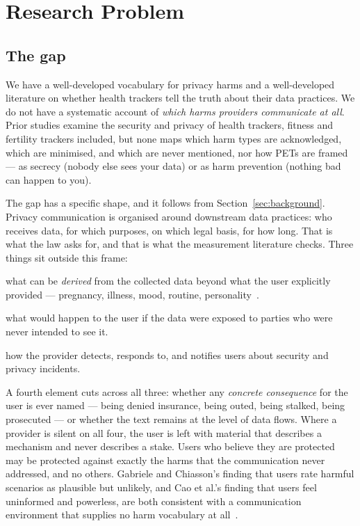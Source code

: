 \section{Research Problem}
\label{sec:problem}

\subsection{The gap}

We have a well-developed vocabulary for privacy harms and a well-developed
literature on whether health trackers tell the truth about their data
practices. We do not have a systematic account of \emph{which harms providers
communicate at all}. Prior studies examine the security and privacy of health
trackers, fitness and fertility trackers included, but none maps which harm
types are acknowledged, which are minimised, and which are never mentioned, nor
how PETs are framed --- as secrecy (nobody else sees your data) or as harm
prevention (nothing bad can happen to you).

The gap has a specific shape, and it follows from Section~\ref{sec:background}.
Privacy communication is organised around downstream data practices: who
receives data, for which purposes, on which legal basis, for how long. That is
what the law asks for, and that is what the measurement literature checks. Three
things sit outside this frame:

\begin{description}[leftmargin=2.4cm,style=nextline,itemsep=3pt]
  \item[\textbf{Inference}] what can be \emph{derived} from the collected data
    beyond what the user explicitly provided --- pregnancy, illness, mood,
    routine, personality~\parencite{martin2025cookies,niksirat2024wearable}.
  \item[\textbf{Breach}] what would happen to the user if the data were exposed
    to parties who were never intended to see it.
  \item[\textbf{Incident handling}] how the provider detects, responds to, and
    notifies users about security and privacy incidents.
\end{description}

A fourth element cuts across all three: whether any \emph{concrete consequence}
for the user is ever named --- being denied insurance, being outed, being
stalked, being prosecuted --- or whether the text remains at the level of data
flows. Where a provider is silent on all four, the user is left with material
that describes a mechanism and never describes a stake. Users who believe they
are protected may be protected against exactly the harms that the communication
never addressed, and no others. Gabriele and Chiasson's finding that users rate
harmful scenarios as plausible but unlikely, and Cao et al.'s finding that users
feel uninformed and powerless, are both consistent with a communication
environment that supplies no harm vocabulary at
all~\parencite{gabriele2020understanding,cao2024deleted}.

